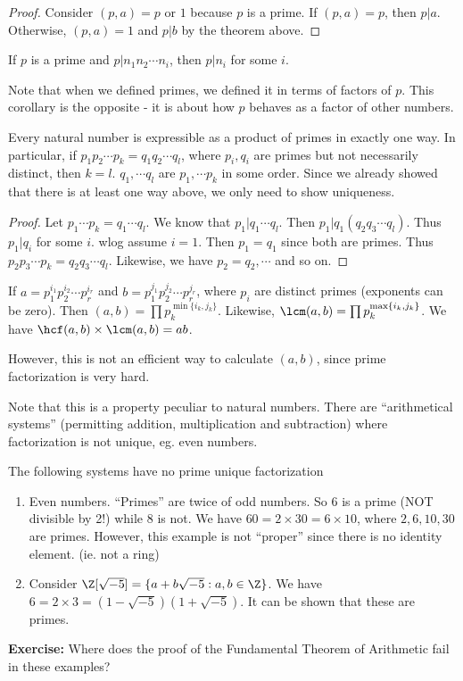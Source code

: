 \documentclass[a4paper]{article}
\begin{document}
\begin{proof}
  Consider $(p, a) = p$ or $1$ because $p$ is a prime. If $(p, a) = p$, then $p | a$. Otherwise, $(p, a) = 1$ and $p | b$ by the theorem above.
\end{proof}

\begin{cor}
  If $p$ is a prime and $p|n_1n_2\cdots n_i$, then $p | n_i$ for some $i$.
\end{cor}
Note that when we defined primes, we defined it in terms of factors of $p$. This corollary is the opposite - it is about how $p$ behaves as a factor of other numbers.

\begin{thm}
  Every natural number is expressible as a product of primes in exactly one way. In particular, if $p_1p_2\cdots p_k = q_1q_2\cdots q_l$, where $p_i, q_i$ are primes but not necessarily distinct, then $k = l$. $q_1, \cdots q_l$ are $p_1, \cdots p_k$ in some order. Since we already showed that there is at least one way above, we only need to show uniqueness.
\end{thm}

\begin{proof}
  Let $p_1\cdots p_k = q_1\cdots q_l$. We know that $p_1 | q_1\cdots q_l$. Then $p_1 | q_1(q_2q_3\cdots q_l)$. Thus $p_1 | q_i$ for some $i$. wlog assume $i = 1$. Then $p_1 = q_1$ since both are primes. Thus $p_2p_3 \cdots p_k = q_2q_3\cdots q_l$. Likewise, we have $p_2 = q_2, \cdots$ and so on.
\end{proof}

\begin{cor}
  If $a = p_1^{i_1}p_2^{i_2}\cdots p_r^{i_r}$ and $b = p_1^{j_1}p_2^{j_2}\cdots p_r^{j_r}$, where $p_i$ are distinct primes (exponents can be zero). Then $(a, b)=\prod p_k^{\min\{i_k, j_k\}}$. Likewise, $\lcm(a, b) = \prod p_k^{\max\{i_k, j_k\}}$. We have $\hcf(a, b)\times\lcm(a, b) = ab$.
\end{cor}
However, this is not an efficient way to calculate $(a, b)$, since prime factorization is very hard.

Note that this is a property peculiar to natural numbers. There are ``arithmetical systems'' (permitting addition, multiplication and subtraction) where factorization is not unique, eg. even numbers.

\begin{eg}
  The following systems have no prime unique factorization
  \begin{enumerate}
    \item Even numbers. ``Primes'' are twice of odd numbers. So 6 is a prime (NOT divisible by 2!) while 8 is not. We have $60 = 2\times 30 = 6\times 10$, where $2, 6, 10, 30$ are primes. However, this example is not ``proper'' since there is no identity element. (ie. not a ring)
    \item Consider $\Z[\sqrt{-5}] = \{a + b\sqrt{-5} : a, b\in \Z\}$. We have $6 = 2\times 3 = (1 - \sqrt{-5})(1 + \sqrt{-5})$. It can be shown that these are primes.
  \end{enumerate}
\end{eg}
\noindent\textbf{Exercise:} Where does the proof of the Fundamental Theorem of Arithmetic fail in these examples?
\end{document}

